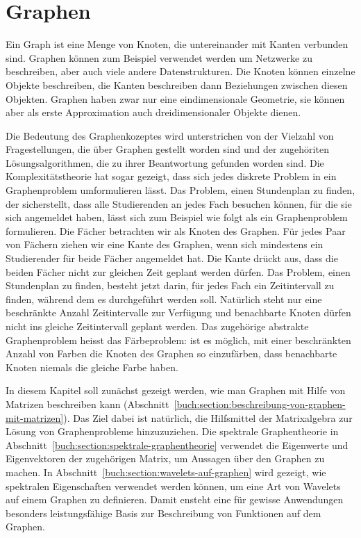 %
%
%
\chapter{Graphen
\label{buch:chapter:graphen}}
\rhead{}
Ein Graph ist eine Menge von Knoten, die untereinander mit Kanten
verbunden sind.
Graphen können zum Beispiel verwendet werden um Netzwerke zu beschreiben,
aber auch viele andere Datenstrukturen.
%
Die Knoten können einzelne Objekte beschreiben, die Kanten beschreiben
dann Beziehungen zwischen diesen Objekten.
Graphen haben zwar nur eine eindimensionale Geometrie, sie können aber als
erste Approximation auch dreidimensionaler Objekte dienen.

Die Bedeutung des Graphenkozeptes wird unterstrichen von der Vielzahl
von Fragestellungen, die über Graphen gestellt worden sind und der
zugehöriten Lösungsalgorithmen, die zu ihrer Beantwortung gefunden
worden sind.
Die Komplexitätstheorie hat sogar gezeigt, dass sich jedes diskrete
Problem in ein Graphenproblem umformulieren lässt.
%
Das Problem, einen Stundenplan zu finden, der sicherstellt, dass
alle Studierenden an jedes Fach besuchen können, für die sie sich
angemeldet haben, lässt sich zum Beispiel wie folgt als ein
Graphenproblem formulieren.
Die Fächer betrachten wir als Knoten des Graphen.
Für jedes Paar von Fächern ziehen wir eine Kante des Graphen, wenn 
sich mindestens ein Studierender für beide Fächer angemeldet hat.
Die Kante drückt aus, dass die beiden Fächer nicht zur gleichen Zeit
geplant werden dürfen.
Das Problem, einen Stundenplan zu finden, besteht jetzt darin, für
jedes Fach ein Zeitintervall zu finden, während dem es durchgeführt
werden soll.
%
Natürlich steht nur eine beschränkte Anzahl Zeitintervalle zur Verfügung
und benachbarte Knoten dürfen nicht ins gleiche Zeitintervall geplant
werden.
Das zugehörige abstrakte Graphenproblem heisst das Färbeproblem: 
%
ist es möglich, mit einer beschränkten Anzahl von Farben die Knoten
des Graphen so einzufärben, dass benachbarte Knoten niemals die gleiche
Farbe haben.

In diesem Kapitel soll zunächst gezeigt werden, wie man Graphen mit 
Hilfe von Matrizen beschreiben kann
(Abschnitt~\ref{buch:section:beschreibung-von-graphen-mit-matrizen}).
Das Ziel dabei ist natürlich, die Hilfsmittel der Matrixalgebra
zur Lösung von Graphenprobleme hinzuzuziehen.
Die spektrale Graphentheorie in
Abschnitt~\ref{buch:section:spektrale-graphentheorie} verwendet
die Eigenwerte und Eigenvektoren der zugehörigen Matrix, um Aussagen
über den Graphen zu machen.
%
In Abschnitt~\ref{buch:section:wavelets-auf-graphen} wird gezeigt,
wie spektralen Eigenschaften verwendet werden können, um eine
Art von Wavelets auf einem Graphen zu definieren.
Damit ensteht eine für gewisse Anwendungen besonders leistungsfähige
Basis zur Beschreibung von Funktionen auf dem Graphen.





